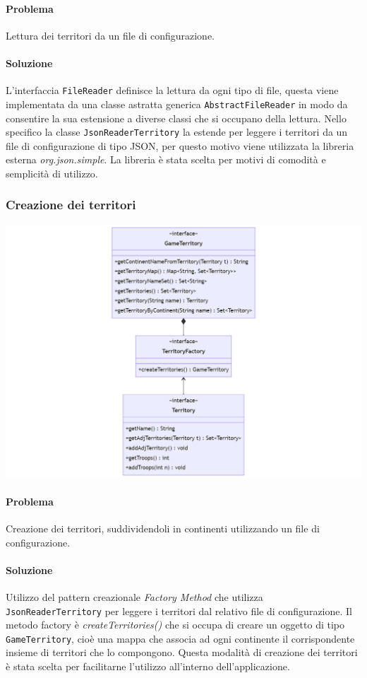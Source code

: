 \documentclass[a4paper,12pt]{report}
\begin{document}
\paragraph*{Problema}
Lettura dei territori da un file di configurazione.
%
\paragraph*{Soluzione}
L'interfaccia \texttt{FileReader} definisce la lettura da ogni tipo di file, questa viene implementata da una classe astratta generica \linebreak\texttt{AbstractFileReader} in modo da consentire la sua estensione a diverse classi che si occupano della lettura. Nello specifico la classe \texttt{JsonReaderTerritory} la estende per leggere i territori da un file di configurazione di tipo JSON, per questo motivo viene utilizzata la libreria esterna \textit{org.json.simple}. La libreria \`e stata scelta per motivi di comodit\`a e semplicit\`a di utilizzo.
%
\subsubsection{Creazione dei territori}
\includegraphics[width=\textwidth]{img/TerritoryFactory.png}
\paragraph*{Problema}
Creazione dei territori, suddividendoli in continenti utilizzando un file di configurazione.
%
\paragraph*{Soluzione}
Utilizzo del pattern creazionale \textit{Factory Method} che utilizza \linebreak\texttt{JsonReaderTerritory} per leggere i territori dal relativo file di configurazione. Il metodo factory \`e \textit{createTerritories()} che si occupa di creare un oggetto di tipo \texttt{GameTerritory}, cio\`e una mappa che associa ad ogni continente il corrispondente insieme di territori che lo compongono. Questa modalit\`a di creazione dei territori \`e stata scelta per facilitarne l'utilizzo all'interno dell'applicazione.
%
\end{document}
